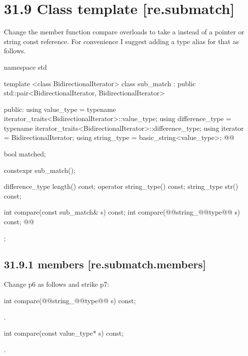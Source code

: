 \documentclass[ebook,11pt,article]{memoir}
\begin{document}
\section{31.9 Class template  [re.submatch]}
Change the member function compare overloads to take a  instead of a pointer or string const reference. For convenience I suggest adding a type alias for that as follows.
\begin{codeblock}
namespace std {
  template <class BidirectionalIterator>
  class sub_match : public std::pair<BidirectionalIterator, BidirectionalIterator> {
  public:
     using value_type      =
             typename iterator_traits<BidirectionalIterator>::value_type;
     using difference_type =
             typename iterator_traits<BidirectionalIterator>::difference_type;
     using iterator        = BidirectionalIterator;
     using string_type     = basic_string<value_type>;
     @@

     bool matched;

     constexpr sub_match();

     difference_type length() const;
     operator string_type() const;
     string_type str() const;

     int compare(const sub_match& s) const;
     int compare(@@string_@@type@\removed{\&}@ s) const;
     @@
  }; 
}
\end{codeblock}
\subsection{31.9.1  members [re.submatch.members]}
Change p6 as follows and strike p7:

\begin{itemdecl}
int compare(@@string_@@type@\removed{\&}@ s) const;
\end{itemdecl}

\begin{itemdescr}
\pnum\returns  {}.
\end{itemdescr}

\begin{removedblock}
\begin{itemdecl}
int compare(const value_type* s) const;
\end{itemdecl}

\begin{itemdescr}
\pnum\returns  {}.
\end{itemdescr}
\end{removedblock}
\end{document}
